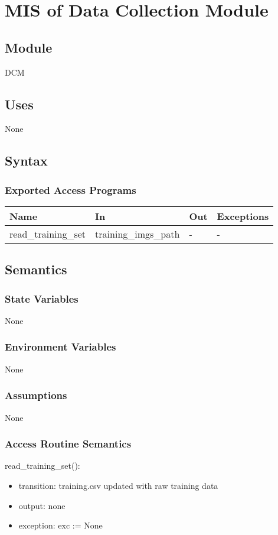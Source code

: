 \documentclass[12pt, titlepage]{article}
\begin{document}
\section{MIS of Data Collection Module} \label{Module} 
\subsection{Module}
DCM
\subsection{Uses}
None
\subsection{Syntax}
\subsubsection{Exported Access Programs}
\begin{center}
\begin{tabular}{p{4cm} p{5cm} p{2cm} p{2cm}}
\hline
\textbf{Name} & \textbf{In} & \textbf{Out} & \textbf{Exceptions} \\
\hline
read\_training\_set & training\_imgs\_path & - & - \\
\hline
\end{tabular}
\end{center}
\subsection{Semantics}
\subsubsection{State Variables}
None
\subsubsection{Environment Variables}
None
\subsubsection{Assumptions}
None
\subsubsection{Access Routine Semantics}
\noindent read\_training\_set():
\begin{itemize}
\item transition: training.csv updated with raw training data
\item output: none
\item exception: exc := None 
\end{itemize}
\end{document}
